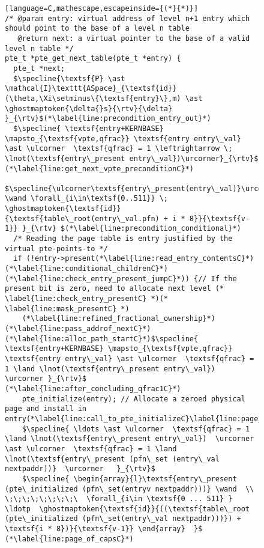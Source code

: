 \begin{figure}\footnotesize
\ifPLDI
\begin{lstlisting}[language=C,mathescape,escapeinside={(*}{*)}]
/* @param entry: virtual address of level n+1 entry which should point to the base of a level n table
   @return next: a virtual pointer to the base of a valid level n table */
pte_t *pte_get_next_table(pte_t *entry) {
  pte_t *next;
  $\specline{\textsf{P} \ast \mathcal{I}\texttt{ASpace}_{\textsf{id}}(\theta,\Xi\setminus\{\textsf{entry}\},m) \ast \ghostmaptoken{\delta{}s}{\rtv}{\delta}  }_{\rtv}$(*\label{line:precondition_entry_out}*)
  $\specline{ \textsf{entry+KERNBASE} \mapsto_{\textsf{vpte,qfrac}} \textsf{entry entry\_val} \ast \ulcorner  \textsf{qfrac} = 1 \leftrightarrow \; \lnot(\textsf{entry\_present entry\_val})\urcorner}_{\rtv}$ (*\label{line:get_next_vpte_preconditionC}*)
  $\specline{\ulcorner\textsf{entry\_present(entry\_val)}\urcorner \wand \forall_{i\in\textsf{0..511}} \; \ghostmaptoken{\textsf{id}}{\textsf{table\_root(entry\_val.pfn) + i * 8}}{\textsf{v-1}} }_{\rtv} $(*\label{line:precondition_conditional}*) 
  /* Reading the page table is entry justified by the virtual pte-points-to */
  if (!entry->present(*\label{line:read_entry_contentsC}*)(*\label{line:conditional_childrenC}*)(*\label{line:check_entry_present_jumpC}*)) {// If the present bit is zero, need to allocate next level (* \label{line:check_entry_presentC} *)(* \label{line:mask_presentC} *) 
    (*\label{line:refined_fractional_ownership}*)(*\label{line:pass_addrof_nextC}*)(*\label{line:alloc_path_startC}*)$\specline{ \textsf{entry+KERNBASE} \mapsto_{\textsf{vpte,qfrac}} \textsf{entry entry\_val} \ast \ulcorner  \textsf{qfrac} = 1 \land \lnot(\textsf{entry\_present entry\_val})  \urcorner }_{\rtv}$ (*\label{line:after_concluding_qfrac1C}*)
    pte_initialize(entry); // Allocate a zeroed physical page and install in entry(*\label{line:call_to_pte_initializeC}\label{line:page_of_capsC}*)
    $\specline{ \ldots \ast \ulcorner  \textsf{qfrac} = 1 \land \lnot(\textsf{entry\_present entry\_val})  \urcorner \ast \ulcorner  \textsf{qfrac} = 1 \land \lnot(\textsf{entry\_present (pfn\_set (entry\_val nextpaddr))}  \urcorner   }_{\rtv}$
    $\specline{ \begin{array}{l}\textsf{entry\_present (pte\_initialized (pfn\_set(entryv nextpaddr)))} \wand  \\ \;\;\;\;\;\;\;\;\  \forall_{i\in \textsf{0 ... 511} } \ldotp  \ghostmaptoken{\textsf{id}}{((\textsf{table\_root (pte\_initialized (pfn\_set(entry\_val nextpaddr)))}) + \textsf{i * 8})}{\textsf{v-1}} \end{array}  }$ (*\label{line:page_of_capsC}*)

\end{lstlisting}
\end{figure}
